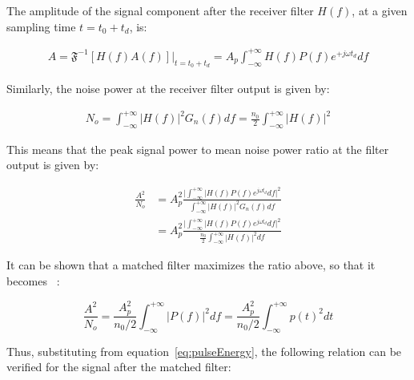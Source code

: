 	The amplitude of the signal component after the receiver filter $H(f)$, at a
	given sampling time $t=t_0+t_d$, is:

	\begin{eqnarray}
		A = \mathfrak{F}^{-1}\left[H(f) A(f)\right]\big|_{t=t_0+t_d} = A_p \int_{-\infty}^{+\infty} H(f) P(f) e^{+j \omega t_d}df
	\end{eqnarray}

	Similarly, the noise power at the receiver filter output is given by:

	\begin{eqnarray}
		N_o = \int_{-\infty}^{+\infty} {|H(f)|}^2 G_n(f) df = \frac{n_0}{2} \int_{-\infty}^{+\infty} {|H(f)|}^2
	\end{eqnarray}

	This means that the peak signal power to mean noise power ratio at the filter
	output is given by:

	\begin{eqnarray}
		\frac{A^2}{N_o} &= A_p^2 \frac{\big|\int_{-\infty}^{+\infty} |H(f) P(f)e^{j\omega t_d} df\big|^2}{\int_{-\infty}^{+\infty} {|H(f)|}^2 G_n(f) df}\\\nonumber
											&= A_p^2 \frac{\big|\int_{-\infty}^{+\infty} |H(f) P(f)e^{j\omega t_d} df\big|^2}{\frac{n_0}{2}\int_{-\infty}^{+\infty} {|H(f)|}^2df}
	\end{eqnarray}

	It can be shown that a matched filter maximizes the ratio above, so that it
	becomes~\cite{carlson86} :

	\begin{equation}
		\frac{A^2}{N_o} = \frac{A_p^2}{n_0/2} \int_{-\infty}^{+\infty} |P(f)|^2 df = \frac{A_p^2}{n_0/2} \int_{-\infty}^{+\infty} p(t)^2 dt
	\end{equation}

%



	Thus, substituting from equation~\ref{eq:pulseEnergy}, the following relation
	can be verified for the signal after the matched filter:

